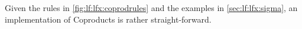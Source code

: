 Given the rules in \autoref{fig:lf:lfx:coprodrules} and the examples in \autoref{sec:lf:lfx:sigma}, an implementation of Coproducts is rather straight-forward.
%	

